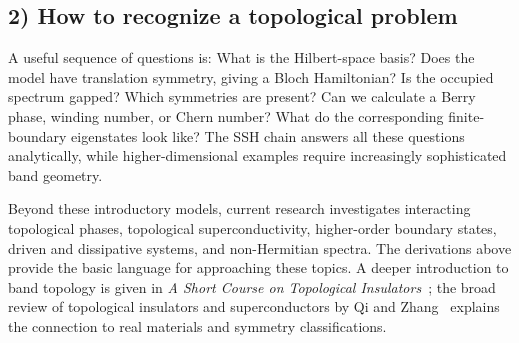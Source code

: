 \subsection*{2) How to recognize a topological problem}
A useful sequence of questions is: What is the Hilbert-space basis? Does the model have translation symmetry, giving a Bloch Hamiltonian? Is the occupied spectrum gapped? Which symmetries are present? Can we calculate a Berry phase, winding number, or Chern number? What do the corresponding finite-boundary eigenstates look like? The SSH chain answers all these questions analytically, while higher-dimensional examples require increasingly sophisticated band geometry.

Beyond these introductory models, current research investigates interacting topological phases, topological superconductivity, higher-order boundary states, driven and dissipative systems, and non-Hermitian spectra. The derivations above provide the basic language for approaching these topics. A deeper introduction to band topology is given in \emph{A Short Course on Topological Insulators}~\cite{Asboth2016}; the broad review of topological insulators and superconductors by Qi and Zhang~\cite{QiZhang2011} explains the connection to real materials and symmetry classifications.